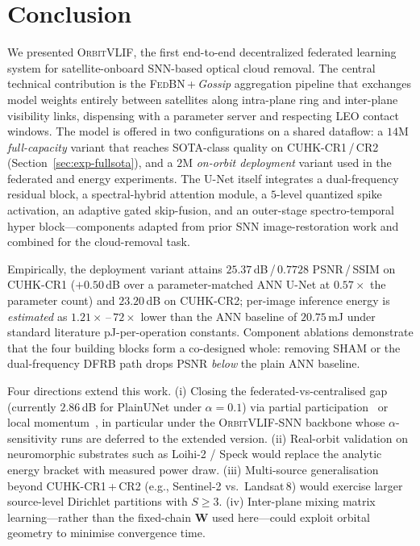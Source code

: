 \documentclass[conference]{IEEEtran}
\newcommand{\OrbitVLIF}{\textsc{OrbitVLIF}}
\newcommand{\DFRB}{\textsc{DFRB}}
\newcommand{\SHAM}{\textsc{SHAM}}
\begin{document}
\section{Conclusion}\label{sec:conclusion}

We presented \OrbitVLIF, the first end-to-end decentralized
federated learning system for satellite-onboard SNN-based optical
cloud removal. The central technical contribution is the
\textsc{FedBN}\,+\,\emph{Gossip} aggregation pipeline that
exchanges model weights entirely between satellites along
intra-plane ring and inter-plane visibility links, dispensing with
a parameter server and respecting LEO contact windows. The model
is offered in two configurations on a shared dataflow: a $14$M
\emph{full-capacity} variant that reaches SOTA-class quality on
CUHK-CR1\,/\,CR2 (Section~\ref{sec:exp-fullsota}), and a $2$M
\emph{on-orbit deployment} variant used in the federated and
energy experiments. The U-Net itself integrates a dual-frequency
residual block, a spectral-hybrid attention module, a $5$-level
quantized spike activation, an adaptive gated skip-fusion, and an
outer-stage spectro-temporal hyper block---components adapted from
prior SNN image-restoration work and combined for the
cloud-removal task.

Empirically, the deployment variant attains
$25.37$\,dB\,/\,$0.7728$ PSNR\,/\,SSIM on CUHK-CR1
($+0.50$\,dB over a parameter-matched ANN U-Net at
$0.57\!\times\!$ the parameter count) and $23.20$\,dB on
CUHK-CR2; per-image inference energy is \emph{estimated} as
$1.21\!\times$\,--\,$72\!\times$ lower than the ANN baseline of
$20.75$\,mJ under standard literature pJ-per-operation
constants. Component ablations demonstrate that the four
building blocks form a co-designed whole: removing \SHAM{} or the
dual-frequency \DFRB{} path drops PSNR \emph{below} the plain ANN
baseline.

Four directions extend this work.
(i) Closing the federated-vs-centralised gap (currently
$2.86$\,dB for PlainUNet under $\alpha\!=\!0.1$) via partial
participation~\cite{ref:fedavg-partial} or local
momentum~\cite{ref:scaffold}, in particular under the
\OrbitVLIF{}-SNN backbone whose $\alpha$-sensitivity runs are
deferred to the extended version.
(ii) Real-orbit validation on neuromorphic substrates such as
Loihi-2 / Speck would replace the analytic energy bracket with
measured power draw.
(iii) Multi-source generalisation beyond
CUHK-CR1\,+\,CR2 (e.g., Sentinel-2 vs.\ Landsat\,8) would exercise
larger source-level Dirichlet partitions with $S\!\geq\!3$.
(iv) Inter-plane mixing matrix learning---rather than the
fixed-chain $\mathbf{W}$ used here---could exploit orbital
geometry to minimise convergence time.
\end{document}
